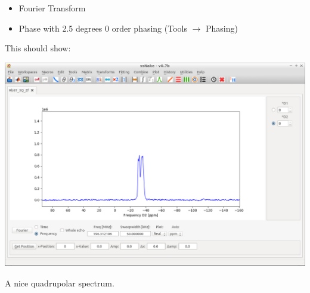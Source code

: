 \documentclass[11pt,a4paper]{article}
\begin{document}
\begin{itemize}
	\item Fourier Transform
	\item Phase with 2.5 degrees 0 order phasing (Tools  $\longrightarrow$ Phasing)
\end{itemize}

This should show:
\begin{center}
\includegraphics[width=0.8\linewidth]{Figs/Fig2.png}
\end{center}
A nice quadrupolar spectrum.
\end{document}
